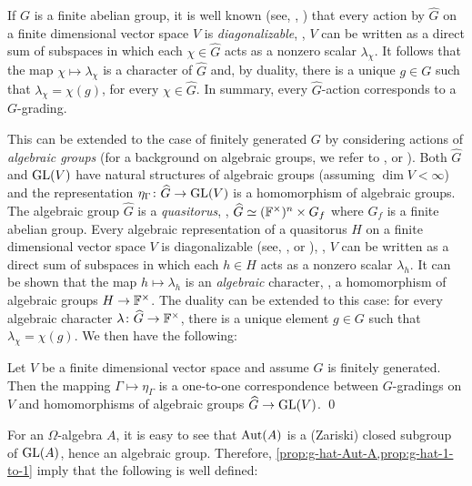 
% 

If $G$ is a finite abelian group, it is well known (see, \eg, \cite[\S 1.2]{FultonAndHarris}) that every action by $\widehat G$ on a finite dimensional vector space $V$ is \emph{diagonalizable}, \ie, $V$ can be written as a direct sum of subspaces in which each $\chi \in \widehat G$ acts as a nonzero scalar $\lambda_\chi$. 
It follows that the map $\chi \mapsto \lambda_\chi$ is a character of $\widehat G$ and, by duality, there is a unique $g \in G$ such that $\lambda_\chi = \chi(g)$, for every $\chi \in \widehat G$. 
In summary, every $\widehat G$-action corresponds to a $G$-grading.

This can be extended to the case of finitely generated $G$ by considering actions of \emph{algebraic groups} (for a background on algebraic groups, we refer to \cite{MR1064110}, \cite{Arzhantsev-notes} or \cite[Appendix A]{livromicha}). 
Both $\widehat G$ and $\operatorname{GL} (V)$ have natural structures of algebraic groups  (assuming $\dim V < \infty$) and the representation $\eta_\Gamma \colon \widehat G \to \operatorname{GL} (V)$ is a homomorphism of algebraic groups. 
The algebraic group $\widehat G$ is a \emph{quasitorus}, \ie, $\widehat G \simeq (\mathbb{F}^\times)^n \times G_f$ where $G_f$ is a finite abelian group. 
Every algebraic representation of a quasitorus $H$ on a finite dimensional vector space $V$ is diagonalizable (see, \eg, \cite[Chapter 3, \S 2, Theorem 3]{MR1064110} or \cite[Theorem 1.6.13]{Arzhantsev-notes}), \ie, $V$ can be written as a direct sum of subspaces in which each $h \in H$ acts as a nonzero scalar $\lambda_h$. 
It can be shown that the map $h \mapsto \lambda_h$ is an \emph{algebraic} character, \ie, a homomorphism of algebraic groups $H \to \mathbb{F}^\times$. 
The duality can be extended to this case: for every algebraic character $\lambda\colon \widehat G \to \mathbb{F}^\times$, there is a unique element $g\in G$ such that $\lambda_\chi = \chi(g)$. 
We then have the following:

\begin{prop}\label{prop:g-hat-1-to-1}
    Let $V$ be a finite dimensional vector space and assume $G$ is finitely generated. 
    Then the mapping $\Gamma \mapsto \eta_\Gamma$ is a one-to-one correspondence between $G$-gradings on $V$ and homomorphisms of algebraic groups $\widehat G \to \operatorname{GL}(V)$. \qed
\end{prop}


For an $\Omega$-algebra $A$, it is easy to see that $\operatorname{Aut} (A)$ is a (Zariski) closed subgroup of $\operatorname{GL} (A)$, hence an algebraic group.
Therefore, \cref{prop:g-hat-Aut-A,prop:g-hat-1-to-1} imply that the following is well defined:

